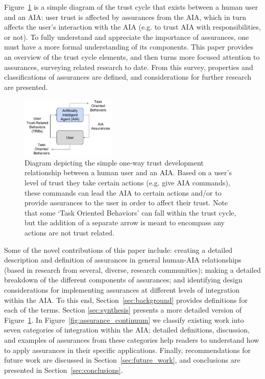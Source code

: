 Figure~\ref{fig:SimpleTrust_one_way} is a simple diagram of the trust cycle that exists between a human user and an AIA: user trust is affected by assurances from the AIA, which in turn affects the user's interaction with the AIA (e.g. to trust AIA with responsibilities, or not). To fully understand and appreciate the importance of assurances, one must have a more formal understanding of its components. This paper provides an overview of the trust cycle elements, and then turns more focused attention to assurances, surveying related research to date. From this survey, properties and classifications of assurances are defined, and considerations for further research are presented. 
%
\begin{figure}
    \centering
    \includegraphics[width=0.4\textwidth]{Figures/SimpleTrust_one_way}
    \caption{Diagram depicting the simple one-way trust development relationship between a human user and an AIA. Based on a user's level of trust they take certain actions (e.g. give AIA commands), these commands can lead the AIA to certain actions and/or to provide assurances to the user in order to affect their trust. Note that some `Task Oriented Behaviors' can fall within the trust cycle, but the addition of a separate arrow is meant to encompass any actions are not trust related.}
    \label{fig:SimpleTrust_one_way}
\end{figure}
%
Some of the novel contributions of this paper include: creating a detailed description and definition of assurances in general human-AIA relationships (based in research from several, diverse, research communities); making a detailed breakdown of the different components of assurances; and identifying design considerations for implementing assurances at different levels of integration within the AIA. To this end, Section~\ref{sec:background} provides definitions for each of the terms. Section \ref{sec:synthesis} presents a more detailed version of Figure~\ref{fig:SimpleTrust_one_way}. In Figure~\ref{fig:assurance_continuum} we classify existing work into seven categories of integration within the AIA; detailed definitions, discussion, and examples of assurances from these categories help readers to understand how to apply assurances in their specific applications. Finally, recommendations for future work are discussed in Section~\ref{sec:future_work}, and conclusions are presented in Section~\ref{sec:conclusions}.
